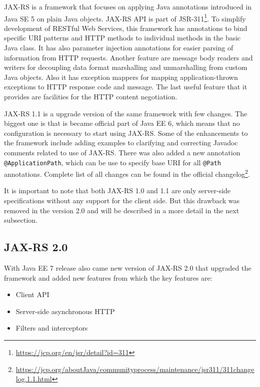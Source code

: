 \documentclass[12pt,final,oneside]{fithesis2}
\begin{document}
JAX-RS is a framework that focuses on applying Java annotations introduced in Java SE 5 on plain Java objects. JAX-RS API is part of JSR-311\footnote{\url{https://jcp.org/en/jsr/detail?id=311}}. To simplify development of RESTful Web Services, this framework has annotations to bind specific URI patterns and HTTP methods to individual methods in the basic Java class. It has also parameter injection annotations for easier parsing of information from HTTP requests. Another feature are message body readers and writers for decoupling data format marshalling and unmarshalling from custom Java objects. Also it has exception mappers for mapping application-thrown exceptions to HTTP response code and message. The last useful feature that it provides are facilities for the HTTP content negotiation.\cite{resteasy-book}\cite{jax-wiki}

JAX-RS 1.1 is a upgrade version of the same framework with few changes. The biggest one is that is became official part of Java EE 6, which means that no configuration is necessary to start using JAX-RS. Some of the enhancements to the framework include adding examples to clarifying and correcting Javadoc comments related to use of JAX-RS. There was also added a new annotation \texttt{@ApplicationPath}, which can be use to specify base URI for all \texttt{@Path} annotations. Complete list of all changes can be found in the official changelog\footnote{\url{https://jcp.org/aboutJava/communityprocess/maintenance/jsr311/311changelog.1.1.html}}. \cite{jax-1.1}\cite{jax-1.1-2}

It is important to note that both JAX-RS 1.0 and 1.1 are only server-side specifications without any support for the client side. But this drawback was removed in the version 2.0 and will be described in a more detail in the next subsection.

\subsection{JAX-RS 2.0}\label{jax2.0}
With Java EE 7 release also came new version of JAX-RS 2.0 that upgraded the framework and added new features from which the key features are:
\begin{itemize}
\item
Client API

\item 
Server-side asynchronous HTTP

\item
Filters and interceptors
\end{itemize}
\end{document}
